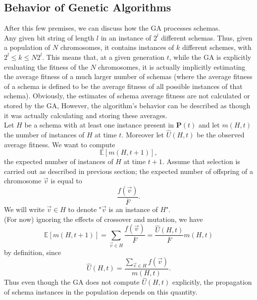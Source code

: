 \documentclass[%
    corpo=11pt,
    twoside,
    stile=classica,
    oldstyle,
    autoretitolo,
    tipotesi=magistrale,
    greek,
    evenboxes,
    english
]{toptesi}
\begin{document}
\subsection{Behavior of Genetic Algorithms}
\label{gabehavior}
After this few premises, we can discuss how the GA processes schemas. \\
Any given bit string of length $l$ in an instance of $2^l$ different schemas. Thus, given a population of $N$ chromosomes, it contains instances of $k$ different schemes, with $2^l \leq k \leq N2^l$. This means that, at a given generation $t$, while the GA is explicitly evaluating the fitness of the $N$ chromosomes, it is actually implicitly estimating the average fitness of a much larger number of schemas (where the average fitness of a schema is defined to be the average fitness of all possible instances of that schema). Obviously, the estimates of schema average fitness are not calculated or stored by the GA, However, the algorithm's behavior can be described as though it was actually calculating and storing these averages. \\
Let $H$ be a schema with at least one instance present in $\textbf{P}(t)$ and let $m(H,t)$ the number of instances of $H$ at time $t$. Moreover let $\hat{U}(H,t)$ be the observed average fitness. We want to compute 
\begin{equation}
\mathbb{E}\left[m(H, t + 1) \right],
\end{equation}
the expected number of instances of $H$ at time $t+1$. Assume that selection is carried out as described in previous section; the expected number of offspring of a chromosome $\vec{v}$ is equal to
\begin{equation}
\frac{f(\vec{v})}{\overline{F}}.
\end{equation}
We will write $\vec{v} \in H$ to denote "$\vec{v}$ is an instance of $H$". \\
(For now) ignoring the effects of crossover and mutation, we have
\begin{equation}
\label{expectedmult}
\mathbb{E}\left[m(H, t + 1) \right] = \sum_{\vec{v} \in H}\frac{f(\vec{v})}{\overline{F}} = \frac{\hat{U}(H,t)}{\overline{F}}m(H,t)
\end{equation}
by definition, since
\begin{equation}
\hat{U}(H,t) = \frac{\sum_{\vec{v} \in H}f(\vec{v})}{m(H,t)}.
\end{equation}
Thus even though the GA does not compute $\hat{U}(H,t)$ explicitly, the propagation of schema instances in the population depends on this quantity. \\
\end{document}
